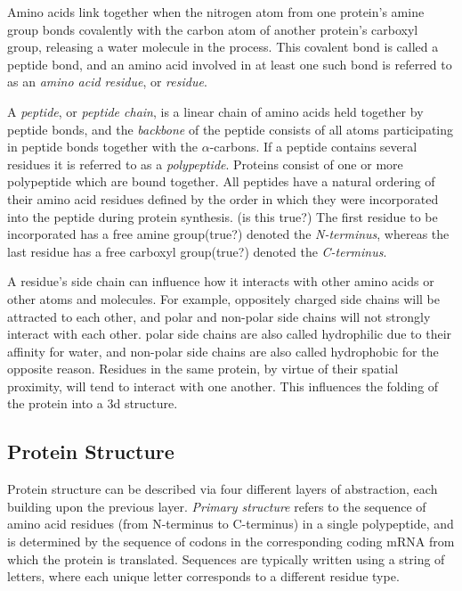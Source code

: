 Amino acids link together when the nitrogen atom from one protein's amine group bonds covalently with the carbon atom of another protein's carboxyl group, releasing a water molecule in the process.
This covalent bond is called a peptide bond, and an amino acid involved in at least one such bond is referred to as an \textit{amino acid residue}, or \textit{residue}.

A \textit{peptide}, or \textit{peptide chain}, is a linear chain of amino acids held together by peptide bonds, and the \textit{backbone} of the peptide consists of all atoms participating in peptide bonds together with the $\alpha$-carbons.
If a peptide contains several residues it is referred to as a \textit{polypeptide}.
Proteins consist of one or more polypeptide which are bound together.
All peptides have a natural ordering of their amino acid residues defined by the order in which they were incorporated into the peptide during protein synthesis. (is this true?)
The first residue to be incorporated has a free amine group(true?) denoted the \textit{N-terminus}, whereas the last residue has a free carboxyl group(true?) denoted the \textit{C-terminus}.


A residue's side chain can influence how it interacts with other amino acids or other atoms and molecules. For example, oppositely charged side chains will be attracted to each other, and polar and non-polar side chains will not strongly interact with each other. 
polar side chains are also called hydrophilic due to their affinity for water, and non-polar side chains are also called hydrophobic for the opposite reason.
Residues in the same protein, by virtue of their spatial proximity, will tend to interact with one another. 
This influences the folding of the protein into a 3d structure.



\subsection{Protein Structure}

Protein structure can be described via four different layers of abstraction, each building upon the previous layer. 
\textit{Primary structure} refers to the sequence of amino acid residues (from N-terminus to C-terminus) in a single polypeptide, and is determined by the sequence of codons in the corresponding coding mRNA from which the protein is translated.
Sequences are typically written using a string of letters, where each unique letter corresponds to a different residue type. 


